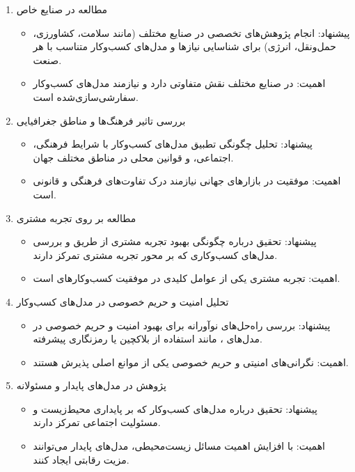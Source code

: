 \documentclass[10pt, twocolumn]{article}
\begin{document}
\begin{enumerate}
\item 
مطالعه در صنایع خاص  

\begin{itemize}
\item پیشنهاد: انجام پژوهش‌های تخصصی در صنایع مختلف (مانند سلامت، کشاورزی، حمل‌ونقل، انرژی) برای شناسایی نیازها و مدل‌های کسب‌وکار متناسب با هر صنعت.  
\item اهمیت:  در صنایع مختلف نقش متفاوتی دارد و نیازمند مدل‌های کسب‌وکار سفارشی‌سازی‌شده است.  
\end{itemize}

\item 
بررسی تاثیر فرهنگ‌ها و مناطق جغرافیایی  

\begin{itemize}
\item پیشنهاد: تحلیل چگونگی تطبیق مدل‌های کسب‌وکار  با شرایط فرهنگی، اجتماعی، و قوانین محلی در مناطق مختلف جهان.  
\item اهمیت: موفقیت  در بازارهای جهانی نیازمند درک تفاوت‌های فرهنگی و قانونی است.  
\end{itemize}

\item 
مطالعه بر روی تجربه مشتری   
\begin{itemize}
\item پیشنهاد: تحقیق درباره چگونگی بهبود تجربه مشتری از طریق  و بررسی مدل‌های کسب‌وکاری که بر محور تجربه مشتری تمرکز دارند.  
\item اهمیت: تجربه مشتری یکی از عوامل کلیدی در موفقیت کسب‌وکارهای  است.  
\end{itemize}

\item 
تحلیل امنیت و حریم خصوصی در مدل‌های کسب‌وکار   
\begin{itemize}
\item پیشنهاد: بررسی راه‌حل‌های نوآورانه برای بهبود امنیت و حریم خصوصی در مدل‌های ، مانند استفاده از بلاکچین یا رمزنگاری پیشرفته.  
\item اهمیت: نگرانی‌های امنیتی و حریم خصوصی یکی از موانع اصلی پذیرش  هستند.  
\end{itemize}

\item 
پژوهش در مدل‌های پایدار و مسئولانه   

\begin{itemize}
\item پیشنهاد: تحقیق درباره مدل‌های کسب‌وکار  که بر پایداری محیط‌زیست و مسئولیت اجتماعی تمرکز دارند.  
\item اهمیت: با افزایش اهمیت مسائل زیست‌محیطی، مدل‌های پایدار می‌توانند مزیت رقابتی ایجاد کنند.  
\end{itemize}


\end{enumerate}
\end{document}
